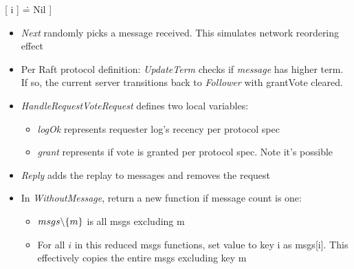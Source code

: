 \documentclass{report}
\begin{document}
\begin{tlatex}
{ {\EXCEPT} {\bang} [ i ] \.{=} Nil ]}%
%
%
\@xx{}%
\@pvspace{8.0pt}%
%
%
%
%
%
\@xx{}%
%
%
\@xx{}%
%
%
%
%
%
%
%
%
%
%
%
\@x{}\moduleLeftDash{}\moduleRightDash\@xx{}%
\end{tlatex}

\begin{itemize}
    \item \textit{Next} randomly picks a message received. This simulates
    network reordering effect
    \item Per Raft protocol definition: \textit{UpdateTerm} checks if
    \textit{message} has higher term. If so, the current server transitions back
    to \textit{Follower} with grantVote cleared.
    \item \textit{HandleRequestVoteRequest} defines two local variables:
    \begin{itemize}
        \item \textit{logOk} represents requester log's recency per protocol spec 
        \item \textit{grant} represents if vote is granted per protocol spec. Note it's possible 
    \end{itemize}
    \item \textit{Reply} adds the replay to messages and removes the request
    \item In \textit{WithoutMessage}, return a new function if message count is one: 
    \begin{itemize}
        \item $msgs \symbol{92} \{m\}$ is all msgs excluding m
        \item For all $i$ in this reduced msgs functions, set value to key i as
        msgs[i]. This effectively copies the entire msgs excluding key m
    \end{itemize}
\end{itemize}
\end{document}
